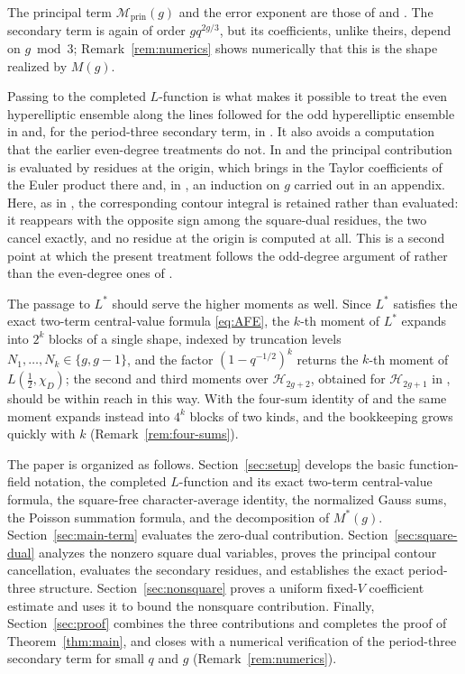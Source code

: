 \documentclass[a4paper,reqno]{amsart}
\numberwithin{equation}{section}
\theoremstyle{remark}
\theoremstyle{definition}
\begin{document}
The principal term $\mathcal M_{\mathrm{prin}}(g)$ and the error exponent are
those of \cite[Theorem~1.4]{AM-21} and \cite[Theorem~1.1]{Ju20}. 
The secondary term is again of order $gq^{2g/3}$, but its coefficients, unlike
theirs, depend on $g\bmod3$; Remark~\ref{rem:numerics} shows numerically that
this is the shape realized by $M(g)$.

Passing to the completed $L$-function is what makes it possible to treat the
even hyperelliptic ensemble along the lines followed for the odd hyperelliptic
ensemble in \cite{Fl17-1} and, for the period-three secondary term, in
\cite{Ju26}. It also avoids a computation that the earlier even-degree
treatments do not. In \cite{AM-21} and \cite{Ju20} the principal contribution
is evaluated by
residues at the origin, which brings in the Taylor coefficients of the Euler
product there and, in \cite{AM-21}, an induction on $g$ carried out in an
appendix. Here, as in \cite[Section~8]{Fl17-1}, the corresponding contour
integral is retained rather than evaluated: it reappears with the opposite
sign among the square-dual residues, the two cancel exactly, and no residue
at the origin is computed at all. 
This is a second point at which the present treatment follows the odd-degree
argument of \cite{Fl17-1} rather than the even-degree ones of \cite{AM-21, Ju20}.

The passage to $L^*$ should serve the higher moments as well. Since $L^*$
satisfies the exact two-term central-value formula \eqref{eq:AFE}, the
$k$-th moment of $L^*$ expands into $2^k$ blocks of a single shape, indexed
by truncation levels $N_1,\dots,N_k\in\{g,g-1\}$, and the factor
$(1-q^{-1/2})^k$ returns the $k$-th moment of
$L\!\left(\tfrac12,\chi_D\right)$; the second and third moments over
$\mathcal H_{2g+2}$, obtained for $\mathcal H_{2g+1}$ in \cite{Fl17-2},
should be within reach in this way. With the four-sum identity of
\cite[Lemma~2.1]{Ju20} and \cite[Lemma~2.4]{AM-21} the same moment expands
instead into $4^k$ blocks of two kinds, and the bookkeeping grows quickly
with $k$ (Remark~\ref{rem:four-sums}).

The paper is organized as follows. Section~\ref{sec:setup} develops
the basic function-field notation, the completed $L$-function and
its exact two-term central-value formula, the square-free
character-average identity, the normalized Gauss sums, the Poisson
summation formula, and the decomposition of $M^*(g)$.
Section~\ref{sec:main-term} evaluates the zero-dual contribution.
Section~\ref{sec:square-dual} analyzes the nonzero square dual
variables, proves the principal contour cancellation, evaluates the
secondary residues, and establishes the exact period-three
structure. Section~\ref{sec:nonsquare} proves a uniform fixed-$V$
coefficient estimate and uses it to bound the nonsquare contribution.
Finally, Section~\ref{sec:proof} combines the three contributions and
completes the proof of Theorem~\ref{thm:main}, and closes with a numerical
verification of the period-three secondary term for small $q$ and $g$
(Remark~\ref{rem:numerics}).
\end{document}
